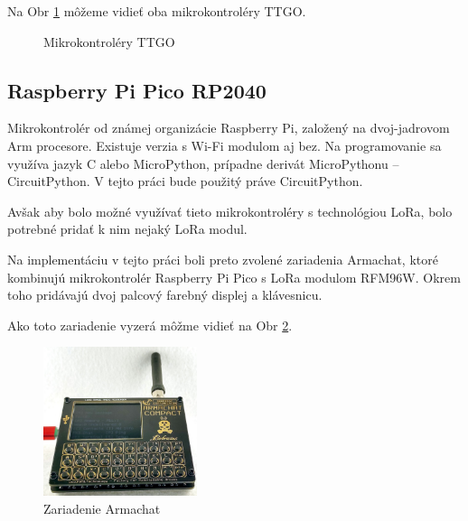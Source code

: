 \documentclass[slovak,master]{diploma}
\begin{document}
Na Obr \ref{fig:ttgo-moduly} môžeme vidieť oba mikrokontroléry TTGO.
\begin{figure}[h!]
  \centering
  \qquad
  \caption{Mikrokontroléry TTGO}
  \label{fig:ttgo-moduly}
\end{figure}
\newpage

\subsection{Raspberry Pi Pico RP2040}
Mikrokontrolér od známej organizácie Raspberry Pi, založený na dvoj-jadrovom Arm procesore. 
Existuje verzia s Wi-Fi modulom aj bez. Na programovanie sa využíva jazyk C alebo MicroPython, 
prípadne derivát MicroPythonu -- CircuitPython. V tejto práci bude použitý práve CircuitPython.

Avšak aby bolo možné využívať tieto mikrokontroléry s technológiou LoRa, bolo potrebné pridať k nim nejaký LoRa modul.

Na implementáciu v tejto práci boli preto zvolené zariadenia Armachat, ktoré kombinujú mikrokontrolér Raspberry Pi Pico s LoRa modulom RFM96W.
Okrem toho pridávajú dvoj palcový farebný displej a klávesnicu.

Ako toto zariadenie vyzerá môžme vidieť na Obr \ref{fig:armachat}.

\begin{figure}[h!]
	\centering
	\includegraphics[width=0.4\textwidth]{Figures/armachat.jpg}
	\caption{Zariadenie Armachat}
	\label{fig:armachat}
\end{figure}
\end{document}
